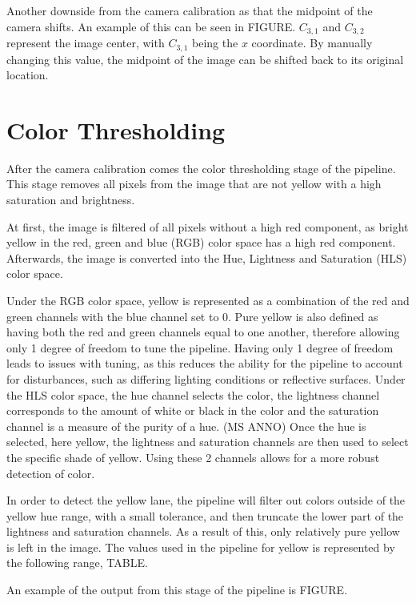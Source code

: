 \documentclass[arbeit=studie,oneside,BCOR=12mm]{ArbeitRST}
\begin{document}
Another downside from the camera calibration as that the midpoint of the camera shifts. An example of this can be seen in FIGURE. $C_{3,1}$ and $C_{3,2}$ represent the image center, with $C_{3,1}$ being the $x$ coordinate. By manually changing this value, the midpoint of the image can be shifted back to its original location.

\section{Color Thresholding}
After the camera calibration comes the color thresholding stage of the pipeline.
This stage removes all pixels from the image that are not yellow with a high
saturation and brightness. 

At first, the image is filtered of all pixels without a high red component, as bright yellow in the red, green and blue (RGB) color space has a high red component. 
Afterwards, the image is converted into the Hue, Lightness and Saturation (HLS) color space. 

Under the RGB color space, yellow is represented as a combination of the red and green channels with the blue channel set to 0. Pure yellow is also defined as having both the red and green channels equal to one another, therefore allowing only 1 degree of freedom to tune the pipeline.  Having only 1 degree of freedom leads to issues with tuning, as this reduces the ability for the pipeline to account for disturbances, such as differing lighting conditions or reflective surfaces.
Under the HLS color space, the hue channel selects the color, the lightness channel corresponds to the amount of white or black in the color and the saturation channel is a measure of the purity of a hue. (MS ANNO) Once the hue is selected, here yellow, the lightness and saturation channels are then used to select the specific shade of yellow. Using these 2 channels allows for a more robust detection of color.

In order to detect the yellow lane, the pipeline will filter out colors outside of the yellow hue range, with a small tolerance, and then truncate the lower part of the lightness and saturation channels. As a result of this, only relatively pure yellow is left in the image.
The values used in the pipeline for yellow is represented by the following range,
TABLE.

An example of the output from this stage of the pipeline is FIGURE.
\end{document}
